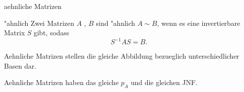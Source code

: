 \documentclass[class=article, crop=false]{standalone}
\begin{document}
\begin{zettel}{aehnliche Matrizen}
\begin{flashcard}
\begin{definition}{"ahnlich}
    Zwei Matrizen $A$ , $B$ sind "ahnlich $A \sim B$, wenn es eine invertierbare Matrix $S$ gibt, sodass
\[
    S^{-1} AS = B
.\]
\end{definition}
\end{flashcard}

Aehnliche Matrizen stellen die gleiche Abbildung bezueglich unterschiedlicher Basen dar.

Aehnliche Matrizen haben das gleiche $p_{A}$ und die gleichen JNF.
\end{zettel}
\end{document}
